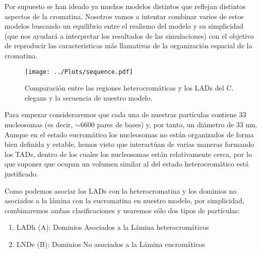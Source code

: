 Por supuesto se han ideado ya muchos modelos distintos que reflejan distintos aspectos de la cromatina. Nosotros vamos a intentar combinar varios de estos modelos buscando un equilibrio entre el realismo del modelo y su simplicidad (que nos ayudará a interpretar los resultados de las simulaciones) con el objetivo de reproducir las características más llamativas de la organización espacial de la cromatina.

\begin{figure}[t]
    \centering
    \texttt{[image: ../Plots/sequence.pdf]}
    \caption{Comparación entre las regiones heterocromáticas y los LADs del C. elegans y la secuencia de nuestro modelo.}
    \label{fig:sequence}
\end{figure}

Para empezar consideraremos que cada una de nuestras partículas contiene 33 nucleosomas (es decir, $\sim6600$ pares de bases) y, por tanto, un diámetro de 33 nm. Aunque en el estado eucromático los nucleosomas no están organizados de forma bien definida y estable, hemos visto que interactúan de varias maneras formando los TADs, dentro de los cuales los nucleosomas están relativamente cerca, por lo que suponer que ocupan un volumen similar al del estado heterocromático está justificado.

Como podemos asociar los LADs con la heterocromatina y los dominios no asociados a la lámina con la eucromatina \cite{Bajpai2021} en nuestro modelo, por simplicidad, combinaremos ambas clasificaciones y usaremos sólo dos tipos de partículas:
\begin{enumerate}
    \item LADh (A): Dominios Asociados a la Lámina heterocromáticos
    \item LNDe (B): Dominios No asociados a la Lámina eucromáticos
\end{enumerate}

